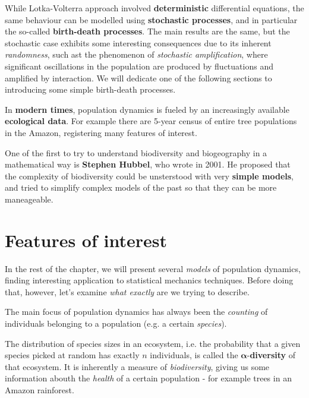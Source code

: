 \documentclass[../../main.tex]{subfiles}
\begin{document}
\medskip

While Lotka-Volterra approach involved \textbf{deterministic} differential equations, the same behaviour can be modelled using \textbf{stochastic processes}, and in particular the so-called \textbf{birth-death processes}. The main results are the same, but the stochastic case exhibits some interesting consequences due to its inherent \textit{randomness}, such ast the phenomenon of \textit{stochastic amplification}, where significant oscillations in the population are produced by fluctuations and amplified by interaction. We will dedicate one of the following sections to introducing some simple birth-death processes.

\medskip

In \textbf{modern times}, population dynamics is fueled by an increasingly available \textbf{ecological data}. For example there are 5-year census of entire tree populations in the Amazon, registering many features of interest.

\medskip

One of the first to try to understand biodiversity and biogeography in a mathematical way is \textbf{Stephen Hubbel}, who wrote  in 2001. He proposed that the complexity of biodiversity could be unsterstood with very \textbf{simple models}, and tried to simplify complex models of the past so that they can be more maneageable.

\section{Features of interest}
In the rest of the chapter, we will present several \textit{models} of population dynamics, finding interesting application to statistical mechanics techniques. Before doing that, however, let's examine \textit{what exactly} are we trying to describe.   

\medskip

The main focus of population dynamics has always been the \textit{counting} of individuals belonging to a population (e.g. a certain \textit{species}). 

The distribution of species sizes in an ecosystem, i.e. the probability that a given species picked at random has exactly $n$ individuals, is called the $\bm{\alpha}$-\textbf{diversity} of that ecosystem. It is inherently a measure of \textit{biodiversity}, giving us some information abouth the \textit{health} of a certain population - for example trees in an Amazon rainforest.
\end{document}
